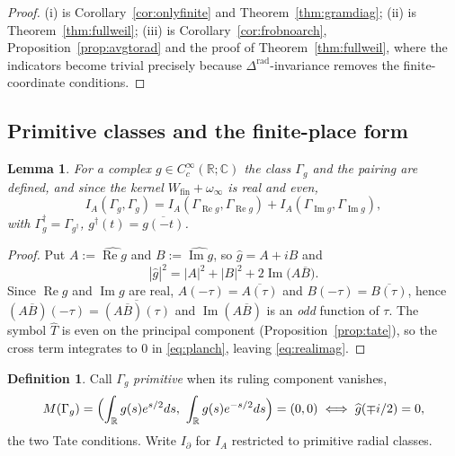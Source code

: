 \documentclass[11pt]{amsart}
\newtheorem{lemma}[theorem]{Lemma}
\theoremstyle{definition}
\newtheorem{definition}[theorem]{Definition}
\theoremstyle{remark}
\newcommand{\C}{\mathbb C}
\newcommand{\R}{\mathbb R}
\newcommand{\Rel}{\operatorname{Re}}
\newcommand{\Iml}{\operatorname{Im}}
\newcommand{\Wfin}{W_{\mathrm{fin}}}
\begin{document}
\begin{proof}
(i) is Corollary~\ref{cor:onlyfinite} and Theorem~\ref{thm:gramdiag}; (ii) is
Theorem~\ref{thm:fullweil}; (iii) is Corollary~\ref{cor:frobnoarch},
Proposition~\ref{prop:avgtorad} and the proof of
Theorem~\ref{thm:fullweil}, where the indicators become trivial precisely
because $\Delta^{\mathrm{rad}}$-invariance removes the finite-coordinate
conditions.
\end{proof}

\subsection{Primitive classes and the finite-place form}

\begin{lemma}\label{lem:complexprofiles}
For a complex $g\in C_c^\infty(\R;\C)$ the class $\Gamma_g$ and the pairing are
defined, and since the kernel $\Wfin+\omega_\infty$ is real and even,
\begin{equation}\label{eq:realimag}
  I_A(\Gamma_g,\Gamma_g)=I_A(\Gamma_{\Rel g},\Gamma_{\Rel g})
   +I_A(\Gamma_{\Iml g},\Gamma_{\Iml g}),
\end{equation}
with $\Gamma_g^\dagger=\Gamma_{g^\dagger}$,
$g^\dagger(t)=\overline{g(-t)}$.
\end{lemma}

\begin{proof}
Put $A:=\widehat{\Rel g}$ and $B:=\widehat{\Iml g}$, so $\widehat g=A+iB$ and
\[
  |\widehat g|^2=|A|^2+|B|^2+2\Iml\bigl(A\overline B\bigr).
\]
Since $\Rel g$ and $\Iml g$ are real, $A(-\tau)=\overline{A(\tau)}$ and
$B(-\tau)=\overline{B(\tau)}$, hence
$(A\overline B)(-\tau)=\overline{(A\overline B)(\tau)}$ and
$\Iml(A\overline B)$ is an \emph{odd} function of $\tau$. The symbol
$\widehat T$ is even on the principal component
(Proposition~\ref{prop:tate}), so the cross term integrates to $0$ in
\eqref{eq:planch}, leaving \eqref{eq:realimag}.
\end{proof}

\begin{definition}\label{def:primitive}
Call $\Gamma_g$ \emph{primitive} when its ruling component vanishes,
\begin{equation}\label{eq:primitive}
  M(\Gamma_g)=\Bigl(\int_\R g(s)e^{s/2}ds,\ \int_\R g(s)e^{-s/2}ds\Bigr)
   =(0,0)\iff\widehat g(\mp i/2)=0 ,
\end{equation}
the two Tate conditions. Write $I_\partial$ for $I_A$ restricted to primitive
radial classes.
\end{definition}
\end{document}

